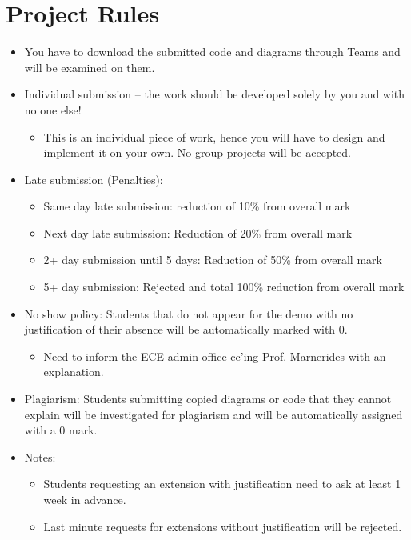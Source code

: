 \documentclass{article}
\begin{document}
\section*{Project Rules}
\begin{itemize}
    \item You have to download the submitted code and diagrams through Teams and will be examined on them.
    \item Individual submission – the work should be developed solely by you and with no one else!
    \begin{itemize}
        \item This is an individual piece of work, hence you will have to design and implement it on your own. No group projects will be accepted.
    \end{itemize}
    \item Late submission (Penalties):
    \begin{itemize}
        \item Same day late submission: reduction of 10\% from overall mark
        \item Next day late submission: Reduction of 20\% from overall mark
        \item 2+ day submission until 5 days: Reduction of 50\% from overall mark
        \item 5+ day submission: Rejected and total 100\% reduction from overall mark
    \end{itemize}
    \item No show policy: Students that do not appear for the demo with no justification of their absence will be automatically marked with 0.
    \begin{itemize}
        \item Need to inform the ECE admin office cc’ing Prof. Marnerides with an explanation.
    \end{itemize}
    \item Plagiarism: Students submitting copied diagrams or code that they cannot explain will be investigated for plagiarism and will be automatically assigned with a 0 mark.
    \item Notes:
    \begin{itemize}
        \item Students requesting an extension with justification need to ask at least 1 week in advance.
        \item Last minute requests for extensions without justification will be rejected.
    \end{itemize}
\end{itemize}
\end{document}
